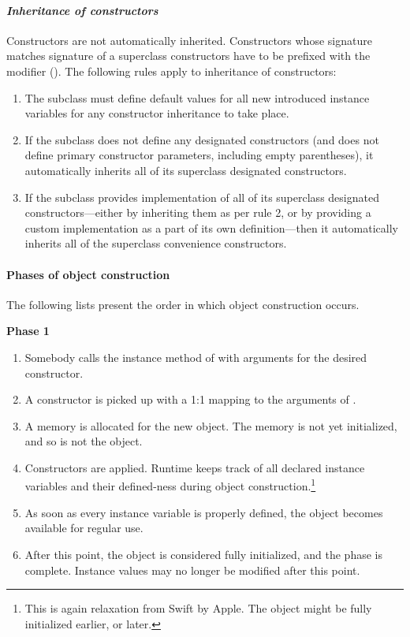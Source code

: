 \paragraph{\em Inheritance of constructors}
Constructors are not automatically inherited. Constructors whose signature matches signature of a superclass constructors have to be prefixed with the  modifier (). The following rules apply to inheritance of constructors:
\begin{enumerate}
  \item[Rule 1] The subclass must define default values for all new introduced instance variables for any constructor inheritance to take place. 
  \item[Rule 2] If the subclass does not define any designated constructors (and does not define primary constructor parameters, including empty parentheses), it automatically inherits all of its superclass designated constructors. 
  \item[Rule 3] If the subclass provides implementation of all of its superclass designated constructors---either by inheriting them as per rule 2, or by providing a custom implementation as a part of its own definition---then it automatically inherits all of the superclass convenience constructors. 
\end{enumerate}

\paragraph{Phases of object construction}
The following lists present the order in which object construction occurs.

{\bfseries Phase 1}
\begin{enumerate}
  \item Somebody calls the  instance method of  with arguments for the desired constructor. 
  \item A constructor is picked up with a 1:1 mapping to the arguments of . 
  \item A memory is allocated for the new object. The memory is not yet initialized, and so is not the object. 
  \item Constructors are applied. Runtime keeps track of all declared instance variables and their defined-ness during object construction.\footnote{This is again relaxation from Swift by Apple. The object might be fully initialized earlier, or later.} 
  \item As soon as every instance variable is properly defined, the  object becomes available for regular use. 
  \item After this point, the object is considered fully initialized, and the phase is complete. Instance values may no longer be modified after this point. 
\end{enumerate}

